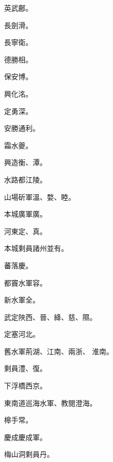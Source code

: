 \begin{pinyinscope}
 英武鄜。



 長劍滑。



 長寧衛。



 德勝相。



 保安博。



 興化洺。



 定勇深。



 安勝通利。



 霜水夔。



 興造衡、潭。



 水路都江陵。



 山場斫軍溫、婺、睦。



 本城廣軍廣。



 河東定、真。



 本城剩員諸州並有。



 蕃落慶。



 都竇水軍容。



 新水軍全。



 武定陜西、晉、絳、慈、隰。



 定塞河北。



 舊水軍荊湖、江南、兩浙、
 淮南。



 剩員澧、復。



 下浮橋西京。



 東南道巡海水軍、教閱澄海。



 槔手常。



 慶成慶成軍。



 梅山洞剩員丹。




\end{pinyinscope}
